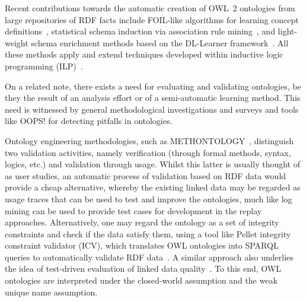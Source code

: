 \documentclass{llncs}
\begin{document}
Recent contributions towards the automatic creation of OWL~2 ontologies
from large repositories of RDF facts include
FOIL-like algorithms for learning concept definitions~\cite{FanizziDAmatoEsposito2008},
statistical schema induction via association rule mining~\cite{FleischhackerVoelkerStuckenschmidt2012},
and light-weight schema enrichment methods based on the DL-Learner
framework~\cite{HellmannLehmannAuer2009,BuehmannLehmann2012}.
All these methods apply and extend techniques developed within inductive logic programming
(ILP)~\cite{ILPat20}.

On a related note, there exists a need for evaluating and validating ontologies,
be they the result of an analysis effort or of a semi-automatic learning method.
This need is witnessed by general methodological investigations
\cite{GangemiCatenacciCiaramitaLehmann2005,GangemiCatenacciCiaramitaLehmann2006}
and surveys \cite{TartirBudakArpinarSheth2007} and tools like OOPS! \cite{PovedaSuarezGomez2012}
for detecting pitfalls in ontologies.

Ontology engineering methodologies, such as METHONTOLOGY~\cite{FernandezGomezJuristo1997},
distinguish two validation activities, namely verification (through formal methods, syntax, logics, etc.)
and validation through usage. Whilst this latter is usually thought of as user studies,
an automatic process of validation based on RDF data would provide a cheap alternative,
whereby the existing linked data may be regarded as usage traces that can be used
to test and improve the ontologies, much like log mining can be used to provide
test cases for development in the replay approaches.
Alternatively, one may regard the ontology as a set of integrity constraints and check if the
data satisfy them, using a tool like Pellet integrity constraint validator (ICV),
which translates OWL ontologies into SPARQL queries to automatically validate RDF data~\cite{SirinTao2009}.
A similar approach also underlies the idea of test-driven evaluation of linked data 
quality~\cite{KontokostasWestphalAuerHellmannLehmannCornelissen2014}.
To this end, OWL ontologies are interpreted under the closed-world assumption and
the weak unique name assumption. 
\end{document}
